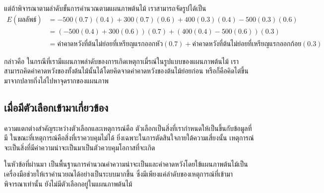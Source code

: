 แต่ถ้าพิจารณาตามลำดับขั้นการคำนวณตามแผนภาพต้นไม้ เราสามารถจัดรูปได้เป็น
\begin{align*}
    E(\text{ผลลัพธ์}) &= -500(0.7)(0.4) + 300(0.7)(0.6) + 400(0.3)(0.4) - 500(0.3)(0.6)\\
                    &= (-500(0.4) + 300(0.6))(0.7)+ (400(0.4) - 500(0.6))(0.3)\\
                    &= \text{ค่าคาดหวังที่ต้นไม่ย่อยที่เหรียญแรกออกหัว}(0.7) + \text{ค่าคาดหวังที่ต้นไม่ย่อยที่เหรียญแรกออกก้อย}(0.3)
\end{align*}
\begin{center}
\end{center}

กล่าวคือ ในกรณีที่เรามีแผนภาพลำดับของการเกิดเหตุกาเมื่รณ์ในรูปแบบของแผนภาพต้นไม้ เราสามารถคิดค่าคาดหวังของทั้งต้นไม้นั้นได้โดยคิดจาดค่าคาดหวังของต้นไม้ย่อยก่อน หรือก็คือคิดไต่ขึ้นมาจากปลายกิ่งไล่ไปหาจุดรากของแผนภาพ

\subsection{เมื่อมีตัวเลือกเข้ามาเกี่ยวข้อง}
ความแตกต่างสำคัญระหว่างตัวเลือกและเหตุการณ์คือ ตัวเลือกเป็นสิ่งที่เรากำหนดให้เป็นขึ้นกับข้อมูลที่มี ในขณะที่เหตุการณ์คือสิ่งที่เราควบคุมไม่ได้ ยิ่งเฉพาะในการตัดสินใจภายใต้ความเสี่ยงนั้น เหตุการณ์จะเป็นสิ่งที่มีค่าความน่าจะเป็นมาเป็นตัวควบคุมโอกาสที่จะเกิด

ในหัวข้อที่ผ่านมา เป็นพื้นฐานการคำนวณค่าความน่าจะเป็นและค่าคาดหวังโดยใข้แผนภาพต้นไม้เป็นเครื่องมือช่วยให้เราคำนวยณได้อย่างเป็นระบบมากขึ้น ซึ่งมีเพียงแค่ลำดับของเหตุการณ์ที่เข้ามาพิจารณาเท่านั้น ยังไม่มีตัวเลือกอยู่ในแผนภาพต้นไม้

